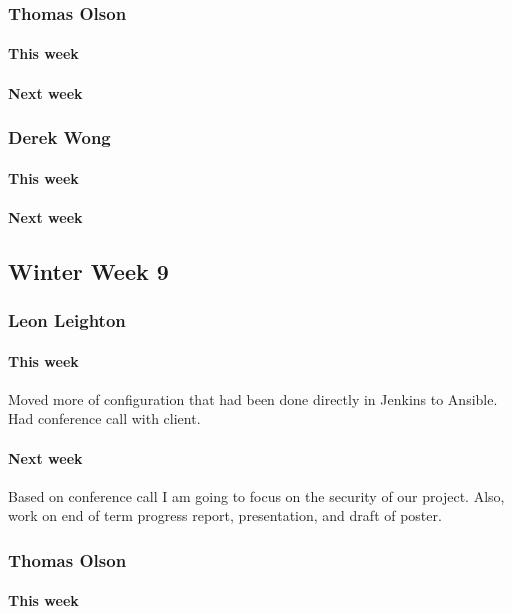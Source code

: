 \documentclass[10pt,letterpaper,onecolumn,draftclsnofoot]{IEEEtran}
\begin{document}
\subsubsection{Thomas Olson}
\paragraph{This week}
\paragraph{Next week}


\subsubsection{Derek Wong}
\paragraph{This week}
\paragraph{Next week}


\subsection{Winter Week 9}
\subsubsection{Leon Leighton}
\paragraph{This week}Moved more of configuration that had been done directly in Jenkins to Ansible.  
Had conference call with client.
\paragraph{Next week} Based on conference call I am going to focus on the security of our project.  
Also, work on end of term progress report, presentation, and draft of poster.


\subsubsection{Thomas Olson}
\paragraph{This week}
\end{document}
